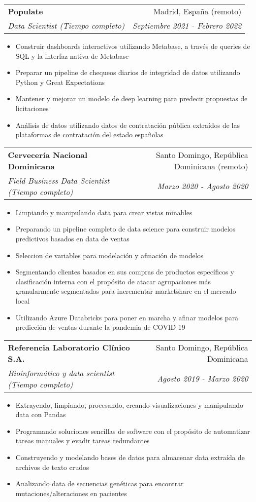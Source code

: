 \documentclass[a4paper,20pt]{article}
\makeatletter
\newcommand{\resumeSubheading}[4]{
  \vspace{-1pt}\item
    \begin{tabular*}{0.97\textwidth}{l@{\extracolsep{\fill}}r}
      \textbf{#1} & #2 \\
      \textit{#3} & \textit{#4} \\
    \end{tabular*}\vspace{-5pt}
}
\makeatother
\begin{document}
  \resumeSubheading{Populate}{Madrid, España (remoto)}
    {Data Scientist (Tiempo completo)}{Septiembre 2021 - Febrero 2022}
\begin{itemize} \itemsep-0.24em
  \item Construir dashboards interactivos utilizando Metabase, a través de queries de SQL y la interfaz nativa de Metabase
  \item Preparar un pipeline de chequeos diarios de integridad de datos utilizando Python y Great Expectations
  \item Mantener y mejorar un modelo de deep learning para predecir propuestas de licitaciones
  \item Análisis de datos utilizando datos de contratación pública extraídos de las plataformas de contratación del estado españolas
\end{itemize}
\vspace{-4.2pt}
  \resumeSubheading{Cervecería Nacional Dominicana}{Santo Domingo, República Dominicana (remoto)}
    {Field Business Data Scientist (Tiempo completo)}{Marzo 2020 - Agosto 2020}
\begin{itemize} \itemsep-0.24em
  \item Limpiando y manipulando data para crear vistas minables
  \item Preparando un pipeline completo de data science para construir modelos predictivos basados en data de ventas
  \item Seleccion de variables para modelación y afinación de modelos
  \item Segmentando clientes basados en sus compras de productos específicos y clasificación interna con el propósito de atacar agrupaciones más granularmente segmentadas para incrementar marketshare en el mercado local
  \item Utilizando Azure Databricks para poner en marcha y afinar modelos para predicción de ventas durante la pandemia de COVID-19
\end{itemize}
\vspace{-4.2pt}
  \resumeSubheading{Referencia Laboratorio Clínico S.A.}{Santo Domingo, República Dominicana}
    {Bioinformático y data scientist (Tiempo completo)}{Agosto 2019 - Marzo 2020}
\begin{itemize} \itemsep-0.24em
  \item Extrayendo, limpiando, procesando, creando visualizaciones y manipulando data con Pandas
  \item Programando soluciones sencillas de software con el propósito de automatizar tareas manuales y evadir tareas redundantes
  \item Construyendo y modelando bases de datos para almacenar data extraída de archivos de texto crudos
  \item Analizando data de secuencias genéticas para encontrar mutaciones/alteraciones en pacientes
\end{itemize}
\end{document}
